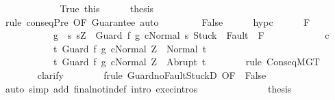 \begin{isabellebody}
\ \ \ \ \ \ \isamarkupfalse%
\isanewline
\ \ \ \ \isamarkupfalse%
\ True\ this\isanewline
\ \ \ \ \isamarkupfalse%
\ {\isacharquery}thesis\ \ \ \ \ \ \isanewline
\ \ \ \ \ \ \isamarkupfalse%
\ {\isacharparenleft}rule\ conseqPre\ {\isacharbrackleft}OF\ Guarantee{\isacharbrackright}{\isacharparenright}\ auto\isanewline
\ \ \isamarkupfalse%
\isanewline
\ \ \ \ \isamarkupfalse%
\ False\isanewline
\ \ \ \ \isamarkupfalse%
\ hyp{\isacharunderscore}c\isanewline
\ \ \ \ \isamarkupfalse%
\ {\isachardoublequoteopen}{\isasymGamma}{\isacharcomma}{\isasymTheta}{\isasymturnstile}\isactrlbsub {\isacharslash}F\isactrlesub \ \isanewline
\ \ \ \ \ \ \ \ \ \ \ {\isacharparenleft}g\ {\isasyminter}\ {\isacharbraceleft}s{\isachardot}\ s{\isacharequal}Z\ {\isasymand}\ {\isasymGamma}{\isasymturnstile}{\isasymlangle}Guard\ f\ g\ c{\isacharcomma}Normal\ s{\isasymrangle}\ {\isasymRightarrow}{\isasymnotin}{\isacharparenleft}{\isacharbraceleft}Stuck{\isacharbraceright}\ {\isasymunion}\ Fault\ {\isacharbackquote}\ {\isacharparenleft}{\isacharminus}F{\isacharparenright}{\isacharparenright}{\isacharbraceright}{\isacharparenright}\ \isanewline
\ \ \ \ \ \ \ \ \ \ \ c\isanewline
\ \ \ \ \ \ \ \ \ \ \ {\isacharbraceleft}t{\isachardot}\ {\isasymGamma}{\isasymturnstile}{\isasymlangle}Guard\ f\ g\ c{\isacharcomma}Normal\ Z{\isasymrangle}\ {\isasymRightarrow}\ Normal\ t{\isacharbraceright}{\isacharcomma}\isanewline
\ \ \ \ \ \ \ \ \ \ \ {\isacharbraceleft}t{\isachardot}\ {\isasymGamma}{\isasymturnstile}{\isasymlangle}Guard\ f\ g\ c{\isacharcomma}Normal\ Z{\isasymrangle}\ {\isasymRightarrow}\ Abrupt\ t{\isacharbraceright}{\isachardoublequoteclose}\isanewline
\ \ \ \ \ \ \isamarkupfalse%
\ {\isacharparenleft}rule\ ConseqMGT{\isacharparenright}\isanewline
\ \ \ \ \ \ \isamarkupfalse%
\ clarify\isanewline
\ \ \ \ \ \ \isamarkupfalse%
\ {\isacharparenleft}frule\ Guard{\isacharunderscore}noFaultStuckD\ {\isacharbrackleft}OF\ {\isacharunderscore}\ False{\isacharbrackright}{\isacharparenright}\isanewline
\ \ \ \ \ \ \isamarkupfalse%
\ {\isacharparenleft}auto\ simp\ add{\isacharcolon}\ final{\isacharunderscore}notin{\isacharunderscore}def\ intro{\isacharcolon}\ exec{\isachardot}intros{\isacharparenright}\isanewline
\ \ \ \ \ \ \isamarkupfalse%
\isanewline
\ \ \ \ \isamarkupfalse%
\ \isamarkupfalse%
\ {\isacharquery}thesis\isanewline
\ \ \ \ \ \ \isamarkupfalse%

\end{isabellebody}
